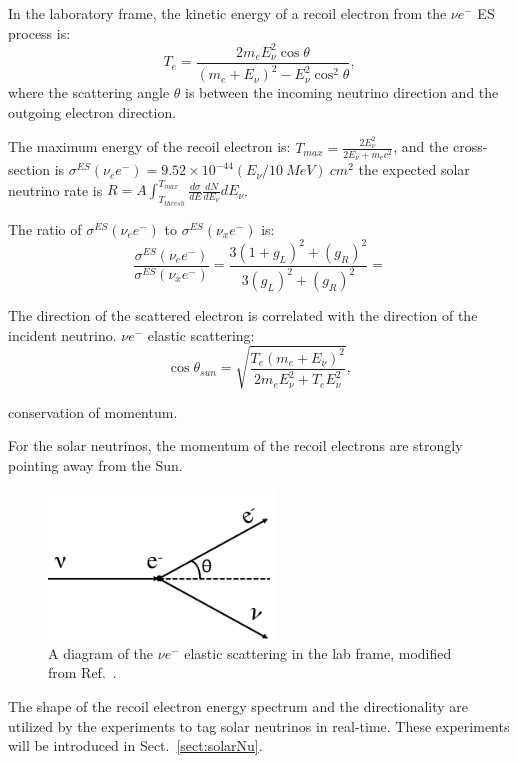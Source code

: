 In the laboratory frame, the kinetic energy of a recoil electron from the $\nu e^-$ ES process is\cite{giunti2007fundamentals}:
\begin{equation}
T_e = \frac{2m_eE_\nu^2\cos\theta}{(m_e+E_\nu)^2-E_\nu^2\cos^2\theta},
\end{equation}
where the scattering angle $\theta$ is between the incoming neutrino direction and the outgoing electron direction.

The maximum energy of the recoil electron is: $T_{max}=\frac{2E^2_\nu}{2E_\nu+m_e c^2}$, and
the cross-section is $\sigma^{ES}(\nu_e e^-)=9.52\times 10^{-44}(E_\nu/10~MeV)~cm^2$
the expected solar neutrino rate is 
$R=A\int_{T_{thresh}}^{T_{max}}\frac{d\sigma}{dE}\frac{dN}{dE_\nu}dE_\nu$.

The ratio of $\sigma^{ES}(\nu_e e^-)$ to $\sigma^{ES}(\nu_x e^-)$ is:
\begin{equation}
\frac{\sigma^{ES}(\nu_e e^-)}{\sigma^{ES}(\nu_x e^-)} = \frac{3(1+g_L)^2+(g_R)^2}{3(g_L)^2+(g_R)^2} = 
\end{equation}


The direction of the scattered electron is correlated with the direction of the incident neutrino. 
$\nu e^-$ elastic scattering: 
\begin{equation}\label{eq:costhetaSun}
\cos\theta_{sun}=\sqrt{\frac{T_e(m_e+E_\nu)^2}{2m_eE_\nu^2+T_eE_\nu^2}},
\end{equation}

conservation of momentum.

For the solar neutrinos, the momentum of the recoil electrons are strongly pointing away from the Sun.
\begin{figure}[htbp]
	\centering	
	\includegraphics[width=6cm]{ElasticScatteringCartoon.png}
	\caption{A diagram of the $\nu e^-$ elastic scattering in the lab frame, modified from Ref.~\cite{giunti2007fundamentals}.	\label{fig:ESdiagram}}
\end{figure}

The shape of the recoil electron energy spectrum and the directionality are utilized by the experiments to tag solar neutrinos in real-time\cite{suzuki2020sun}. These experiments will be introduced in Sect.~\ref{sect:solarNu}.

